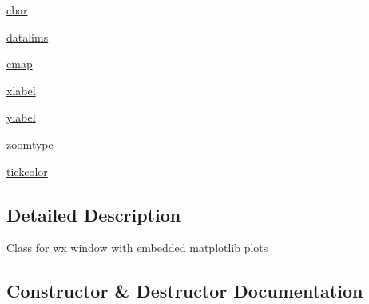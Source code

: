 \begin{DoxyCompactItemize}
\item 
\hyperlink{class_uni_dec_1_1unidec__modules_1_1_plotting_window_1_1_plotting_window_ab8e0fb688914805e5e40443876612be5}{cbar}
\item 
\hyperlink{class_uni_dec_1_1unidec__modules_1_1_plotting_window_1_1_plotting_window_ad1ec773f6c983880193a921cdec6b974}{datalims}
\item 
\hyperlink{class_uni_dec_1_1unidec__modules_1_1_plotting_window_1_1_plotting_window_a2095290ee1011cd826574972f802fb9e}{cmap}
\item 
\hyperlink{class_uni_dec_1_1unidec__modules_1_1_plotting_window_1_1_plotting_window_a8ccd55b8d1edfb1c4c6bfb1b3858cc62}{xlabel}
\item 
\hyperlink{class_uni_dec_1_1unidec__modules_1_1_plotting_window_1_1_plotting_window_a3a236ee84b84a2f3fa77a2a2e4247fe5}{ylabel}
\item 
\hyperlink{class_uni_dec_1_1unidec__modules_1_1_plotting_window_1_1_plotting_window_aaeeeec6814f8ea063a9fa3ee2a4d305e}{zoomtype}
\item 
\hyperlink{class_uni_dec_1_1unidec__modules_1_1_plotting_window_1_1_plotting_window_ab819a5e0cbfde2720a25e02fb75fccb0}{tickcolor}
\end{DoxyCompactItemize}


\subsection{Detailed Description}
\begin{DoxyVerb}Class for wx window with embedded matplotlib plots
\end{DoxyVerb}
 

\subsection{Constructor \& Destructor Documentation}
\hypertarget{class_uni_dec_1_1unidec__modules_1_1_plotting_window_1_1_plotting_window_a069041d1fdaf8d1c2015295218703a3c}{}
